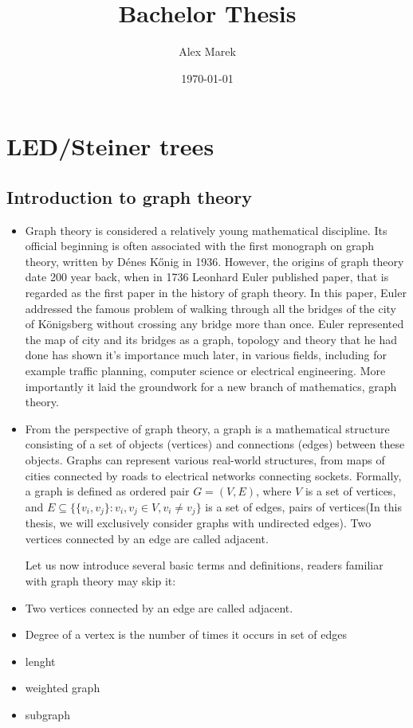 \documentclass[12pt]{article}
\title{Bachelor Thesis}
\author{Alex Marek}
\date{\today}
\begin{document}
	
	\maketitle
	
	\section{LED/Steiner trees}
		
		
	\subsection{Introduction to graph theory}
	\begin{itemize} 
		\item Graph theory is considered a relatively young mathematical discipline. Its official beginning is often associated with the first monograph on graph theory, written by Dénes Kőnig in 1936. However, the origins of graph theory date 200 year back, when in 1736 Leonhard Euler published paper, that is regarded as the first paper in the history of graph theory. In this paper, Euler addressed the famous problem of walking through all the bridges of the city of Königsberg without crossing any bridge more than once. Euler represented the map of city and its bridges as a graph, topology and theory that he had done has shown it's importance much later, in various fields, including for example traffic planning, computer science or electrical engineering. More importantly it laid the groundwork for a new branch of mathematics, graph theory.
		
		\item From the perspective of graph theory, a graph is a mathematical structure consisting of a set of objects (vertices) and connections (edges) between these objects.
 		Graphs can represent various real-world structures, from maps of cities connected by roads to electrical networks connecting sockets.
		Formally, a graph is defined as ordered pair \( G = (V, E) \), where \( V \) is a set of vertices, and \( E \subseteq \{\{v_i, v_j\} : v_i, v_j \in V, v_i \neq v_j\} \) is a set of edges, pairs of vertices(In this thesis, we will exclusively consider graphs with undirected edges). Two vertices connected by an edge are called adjacent. 
		
		Let us now introduce several basic terms and definitions, readers familiar with graph theory may skip it:
			\item Two vertices connected by an edge are called adjacent.
			\item Degree of a vertex is the number of times it occurs in set of edges 
			\item lenght
			\item weighted graph
		 	\item subgraph
		 
	\end{itemize}	
\end{document}
